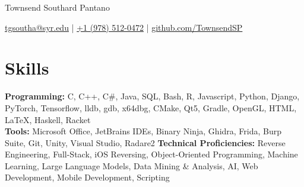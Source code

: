 \documentclass[11pt]{article}       %
\begin{document}
	
	\vspace{-70pt}
	\centerline{\huge Townsend Southard Pantano}
	
	\vspace{-1pt}
	
	\centerline{\href{mailto:tgsoutha@syr.edu}{tgsoutha@syr.edu} | \href{tel:+19785120472}{+1 (978) 512-0472} | \href{https://github.com/TownsendSP}{github.com/TownsendSP}}
	\vspace{-13.5pt}
	\section*{Skills}
	\textbf{Programming:} C, C++, C\#, Java, SQL, Bash, R, Javascript, Python, Django, PyTorch, Tensorflow, lldb, gdb, x64dbg, CMake, Qt5, Gradle, OpenGL, HTML, \LaTeX, Haskell, Racket\\
	\textbf{Tools:} Microsoft Office, JetBrains IDEs, Binary Ninja, Ghidra, Frida, Burp Suite, Git, Unity, Visual Studio, Radare2
	\textbf{Technical Proficiencies:} Reverse Engineering, Full-Stack, iOS Reversing, Object-Oriented Programming, Machine Learning, Large Language Models, Data Mining \& Analysis, AI, Web Development, Mobile Development, Scripting
	\vspace{-17pt}
	
\end{document}
